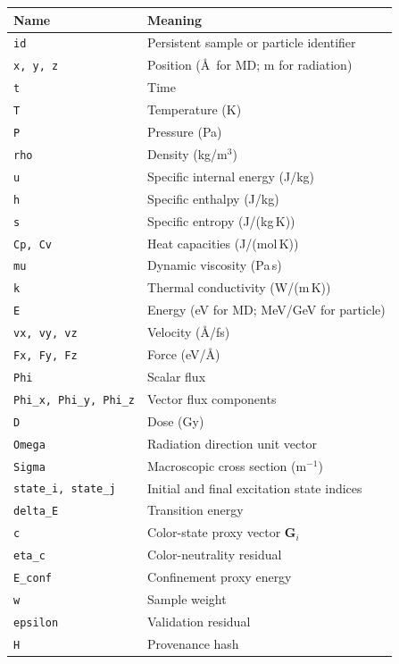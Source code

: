 \documentclass[11pt, a4paper, oneside]{article}
\begin{document}
\begin{center}
\begin{tabular}{ll}
  \toprule
  Name & Meaning \\
  \midrule
  \texttt{id}                     & Persistent sample or particle identifier \\
  \texttt{x, y, z}                & Position (\AA\ for MD; m for radiation) \\
  \texttt{t}                      & Time \\
  \texttt{T}                      & Temperature (K) \\
  \texttt{P}                      & Pressure (Pa) \\
  \texttt{rho}                    & Density (kg/m$^3$) \\
  \texttt{u}                      & Specific internal energy (J/kg) \\
  \texttt{h}                      & Specific enthalpy (J/kg) \\
  \texttt{s}                      & Specific entropy (J/(kg\,K)) \\
  \texttt{Cp, Cv}                 & Heat capacities (J/(mol\,K)) \\
  \texttt{mu}                     & Dynamic viscosity (Pa\,s) \\
  \texttt{k}                      & Thermal conductivity (W/(m\,K)) \\
  \texttt{E}                      & Energy (eV for MD; MeV/GeV for particle) \\
  \texttt{vx, vy, vz}             & Velocity (\AA/fs) \\
  \texttt{Fx, Fy, Fz}             & Force (eV/\AA) \\
  \texttt{Phi}                    & Scalar flux \\
  \texttt{Phi\_x, Phi\_y, Phi\_z} & Vector flux components \\
  \texttt{D}                      & Dose (Gy) \\
  \texttt{Omega}                  & Radiation direction unit vector \\
  \texttt{Sigma}                  & Macroscopic cross section (m$^{-1}$) \\
  \texttt{state\_i, state\_j}     & Initial and final excitation state indices \\
  \texttt{delta\_E}               & Transition energy \\
  \texttt{c}                      & Color-state proxy vector $\mathbf{G}_i$ \\
  \texttt{eta\_c}                 & Color-neutrality residual \\
  \texttt{E\_conf}                & Confinement proxy energy \\
  \texttt{w}                      & Sample weight \\
  \texttt{epsilon}                & Validation residual \\
  \texttt{H}                      & Provenance hash \\
  \bottomrule
\end{tabular}
\end{center}
\end{document}
